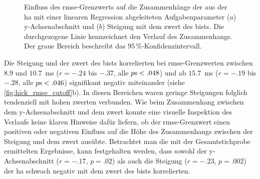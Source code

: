 \documentclass[11pt, twoside, a4paper]{book}		%
\begin{document}
\begin{figure}[htbp]
	\centering
	\begin{adjustbox}{width=1\textwidth}
	\end{adjustbox}
	\newline
	\begin{adjustbox}{width=1\textwidth}
	\end{adjustbox}
	
	\caption[Einfluss des \gls{rmse}-Grenzwerts der \gls{ha} auf den Zusammenhang zwischen dem y-Ach\-sen\-ab\-schnitt, der Steigung und dem \gls{zwert} des \gls{bist}s]{Einfluss des \gls{rmse}-Grenzwerts auf die Zusammenhänge der aus der \gls{ha} mit einer linearen Regression abgeleiteten Aufgabenparameter ($a$) y-Ach\-sen\-ab\-schnitt und ($b$) Steigung mit dem \gls{zwert} des \gls{bist}s. Die durchgezogene Linie kennzeichnet den Verlauf des Zusammenhangs. Der graue Bereich beschreibt das $95\,\%$-Konfidenzintervall.}
	\label{fig:hick_rmse_cutoff}
\end{figure}

Die Steigung und der \gls{zwert} des \gls{bist}s korrelierten bei \gls{rmse}-Grenzwerten zwischen $8.9$ und $10.7$~ms ($r = -.24$ bis $ -.37$, alle $p\textnormal{s} < .048$) und ab $15.7$~ms ($r = -.19$ bis $ -.28$, alle $p\textnormal{s} < .046$) signifikant negativ miteinander (siehe \autoref{fig:hick_rmse_cutoff}b). In diesen Bereichen waren geringe Steigungen folglich tendenziell mit hohen \gls{zwert}en verbunden. Wie beim Zusammenhang zwischen dem y-Ach\-sen\-ab\-schnitt und dem \gls{zwert} konnte eine visuelle Inspektion des Verlaufs keine klaren Hinweise dafür liefern, ob der \gls{rmse}-Grenzwert einen positiven oder negativen Einfluss auf die Höhe des Zusammenhangs zwischen der Steigung und dem \gls{zwert} ausübte.
Betrachtet man die mit der Gesamtstichprobe ermittelten Ergebnisse, kann festgehalten werden, dass sowohl der y-Ach\-sen\-ab\-schnitt ($r=-.17$, $p=.02$) als auch die Steigung ($r=-.23$, $p=.002$) der \gls{ha} schwach negativ mit dem \gls{zwert} des \gls{bist}s korrelierten. %
\end{document}

